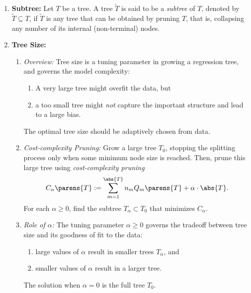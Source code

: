 \documentclass[12pt]{article}
\begin{document}
\begin{enumerate}[label=\textbf{\arabic*.}]
	\item \textbf{Subtree:} Let $T$ be a tree. A tree $\widetilde{T}$ is said to be a \emph{subtree} of $T$, denoted by $\widetilde{T} \subseteq T$, if $\widetilde{T}$ is any tree that can be obtained by pruning $T$, that is, collapsing any number of its internal (non-terminal) nodes. 
	
	\item \textbf{Tree Size:}  
	\begin{enumerate}
		\item \textit{Overview:} Tree size is a tuning parameter in growing a regression tree, and governs the model complexity: 
		\begin{enumerate}
			\item A very large tree might overfit the data, but 
			\item a too small tree might \emph{not} capture the important structure and lead to a large bias. 
		\end{enumerate}
		The optimal tree size should be adaptively chosen from data. 
		
		\item \textit{Cost-complexity Pruning:} Grow a large tree $T_0$, stopping the splitting process only when some minimum node size is reached. Then, prune this large tree using \emph{cost-complexity pruning} 
		\begin{align}
			C_{\alpha} \parens{T} := \sum_{m=1}^{\abs{T}} n_m Q_{m} \parens{T} + \alpha \cdot \abs{T}. 
		\end{align}
		For each $\alpha \ge 0$, find the subtree $T_{\alpha} \subset T_0$ that minimizes $C_{\alpha}$. 
		
		\item \textit{Role of $\alpha$:} The tuning parameter $\alpha \ge 0$ governs the tradeoff between tree size and its goodness of fit to the data: 
		\begin{enumerate}
			\item large values of $\alpha$ result in smaller trees $T_{\alpha}$, and 
			\item smaller values of $\alpha$ result in a larger tree. 
		\end{enumerate}
		The solution when $\alpha = 0$ is the full tree $T_0$. 
		

\end{enumerate}
\end{enumerate}
\end{document}
